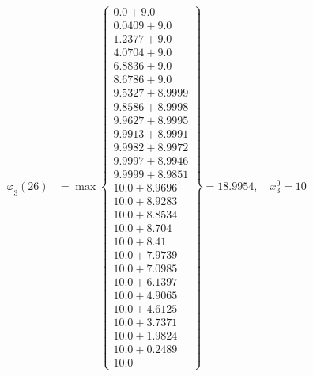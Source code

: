 \documentclass{article}
\begin{document}
\begin{align*}
  
\varphi_{3}(26) &= \max \left\{ \begin{array}{c}
0.0 + 9.0 \\
 0.0409 + 9.0 \\
 1.2377 + 9.0 \\
 4.0704 + 9.0 \\
 6.8836 + 9.0 \\
 8.6786 + 9.0 \\
 9.5327 + 8.9999 \\
 9.8586 + 8.9998 \\
 9.9627 + 8.9995 \\
 9.9913 + 8.9991 \\
 9.9982 + 8.9972 \\
 9.9997 + 8.9946 \\
 9.9999 + 8.9851 \\
 10.0 + 8.9696 \\
 10.0 + 8.9283 \\
 10.0 + 8.8534 \\
 10.0 + 8.704 \\
 10.0 + 8.41 \\
 10.0 + 7.9739 \\
 10.0 + 7.0985 \\
 10.0 + 6.1397 \\
 10.0 + 4.9065 \\
 10.0 + 4.6125 \\
 10.0 + 3.7371 \\
 10.0 + 1.9824 \\
 10.0 + 0.2489 \\
 10.0
\end{array} \right\}=18.9954,\quad x_{3}^0=10\\
  
  
  

\end{align*}
\end{document}
